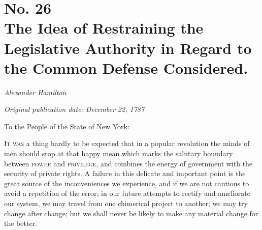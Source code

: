 \chapter[No. 26: The Idea of Restraining the Legislative Authority in Regard to the Common Defense Considered.]{No. 26\\ {\small The Idea of Restraining the Legislative Authority in Regard to the Common Defense Considered.}}

\textit{Alexander Hamilton}

\textit{Original publication date: December 22, 1787}
\vspace{1cm}

To the People of the State of New York:
\vspace{.4cm}

\textsc{It was} a thing hardly to be expected that in a popular revolution the minds of men should stop at that happy mean which marks the salutary boundary between \textsc{power} and \textsc{privilege}, and combines the energy of government with the security of private rights. 
A failure in this delicate and important point is the great source of the inconveniences we experience, and if we are not cautious to avoid a repetition of the error, in our future attempts to rectify and ameliorate our system, we may travel from one chimerical project to another; we may try change after change; but we shall never be likely to make any material change for the better.

